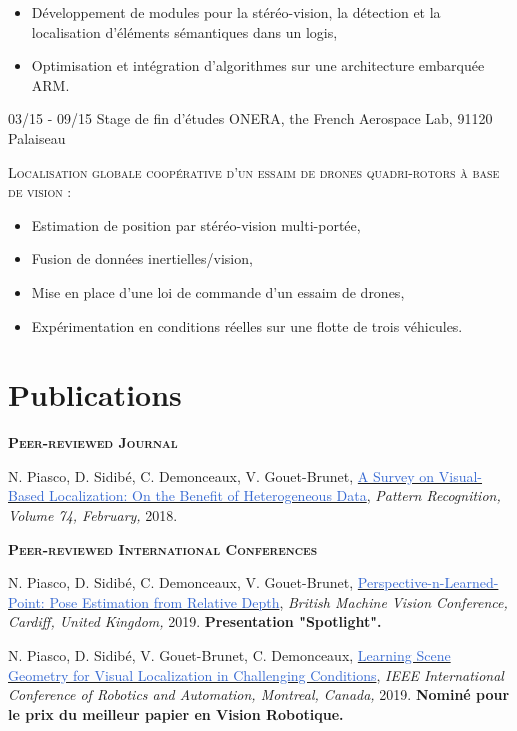 \documentclass[]{friggeri-cv-cust}
\begin{document}
\begin{entrylist}
{\begin{itemize}[label=$\rhd$]
    	\item Développement de modules pour la stéréo-vision, la détection et la localisation d'éléments sémantiques dans un logis,
        \item Optimisation et intégration d'algorithmes sur une architecture embarquée ARM.
    \end{itemize} \vspace{5pt}}
  \entry
    {03/15 - 09/15}
    {Stage de fin d'études}
    {ONERA, the French Aerospace Lab, 91120 Palaiseau}
    {\textsc{Localisation globale coopérative d’un essaim de drones quadri-rotors à base de vision :}
    \begin{itemize}[label=$\rhd$]
    	\item Estimation de position par stéréo-vision multi-portée,
    	\item Fusion de données inertielles/vision,
        \item Mise en place d’une loi de commande d’un essaim de drones, 
        \item Expérimentation en conditions réelles sur une flotte de trois véhicules.
    \end{itemize} \vspace{5pt}}
\end{entrylist}

\newpage
\section{Publications}
    \textsc{\textbf{Peer-reviewed Journal}}
    
    {\footnotesize{N. Piasco, D. Sidibé, C. Demonceaux, V. Gouet-Brunet, \href{http://recherche.ign.fr/labos/matis/pdf/articles_revues/2017/PSDG17.pdf}{\textcolor{highlight}{A Survey on Visual-Based Localization: On the Benefit of Heterogeneous Data}},
\textit{Pattern Recognition, Volume 74, February,} 2018.}}
	
	\vspace{0.5cm}
    \textsc{\textbf{Peer-reviewed International Conferences}}
   
    {\footnotesize{N. Piasco, D. Sidibé, C. Demonceaux, V. Gouet-Brunet, \href{https://hal.archives-ouvertes.fr/hal-02190840}{\textcolor{highlight}{Perspective-n-Learned-Point: Pose Estimation from Relative Depth}},
    \textit{British Machine Vision Conference, Cardiff, United Kingdom,} 2019. \textbf{Presentation "Spotlight".}}}
        
    
    {\footnotesize{N. Piasco, D. Sidibé, V. Gouet-Brunet, C. Demonceaux, \href{http://recherche.ign.fr/labos/matis/pdf/articles_conf/2019/root.pdf}{\textcolor{highlight}{Learning Scene Geometry for Visual Localization in Challenging Conditions}},
\textit{IEEE International Conference of Robotics and Automation, Montreal, Canada,} 2019. \textbf{Nominé pour le prix du meilleur papier en Vision Robotique.}}}
\end{document}
